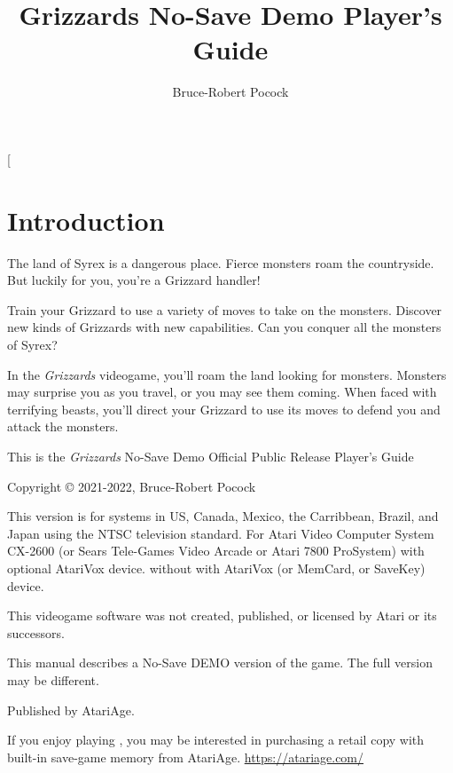 \documentclass[10pt,twocolumn,openany,article]{memoir}
\title{Grizzards \ifdefined\NOSAVE No-Save \fi\ifdefined\DEMO Demo \fi Player's Guide}
\author{Bruce-Robert Pocock}
\newcommand\TV{NTSC}
\newcommand\REGION{US, Canada, Mexico, the Carribbean, Brazil, and Japan}
\newcommand\TV{PAL}
\newcommand\REGION{UK and Europe (except France)}
\newcommand\TV{SECAM}
\newcommand\REGION{France, Russia, and Africa}
\begin{document}
\frontmatter


\thispagestyle{empty}


\twocolumn[

\chapter*{Introduction}\label{Introduction}

The  land of  Syrex  is  a dangerous  place.  Fierce  monsters roam  the
countryside. But luckily for you, you're a Grizzard handler!

Train your Grizzard to  use a variety of moves to  take on the monsters.
Discover new kinds  of Grizzards with new capabilities.  Can you conquer
all the monsters of Syrex?

\bigskip

In the  \textit{Grizzards} videogame, you'll  roam the land  looking for
monsters. Monsters may  surprise you as you travel, or  you may see them
coming. When faced  with terrifying beasts, you'll  direct your Grizzard
to use its moves to defend you and attack the monsters.

\vspace{2in}\vfill

This    is    the     \textit{Grizzards}    \ifdefined\NOSAVE    No-Save
\fi\ifdefined\DEMO Demo \fi\ifdefined\ATARIAGESAVE Official \else Public
Release \fi Player's Guide

Copyright \copyright{} 2021-2022, Bruce-Robert Pocock

\bigskip

This  version is  for systems  in \REGION{}  using the  \TV{} television
standard. For Atari  Video Computer System CX-2600  (or Sears Tele-Games
Video  Arcade  or  Atari 7800  ProSystem)  \ifdefined\ATARIAGESAVE  with
optional AtariVox device. \else \ifdefined\NOSAVE without \else with \fi
AtariVox (or MemCard, or SaveKey) device. \fi

\bigskip

This videogame software was not created, published, or licensed by Atari
or its successors.

\ifdefined\DEMO
\bigskip

This manual  describes a \ifdefined\NOSAVE  No-Save \fi DEMO  version of
the game. The full version may be different.

\fi

Published by AtariAge.

\ifdefined\ATARIAGESAVE\else  If you  enjoy playing  ,
you  may  be  interested  in  purchasing a  retail  copy  with  built-in
save-game          memory           from          AtariAge.          \fi
\href{https://atariage.com/}{https://atariage.com/}
\end{document}
